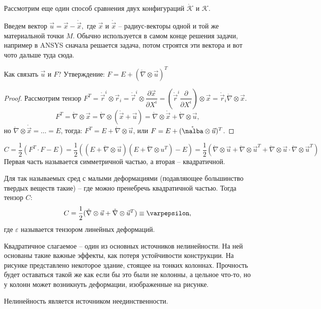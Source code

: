 Рассмотрим еще один способ сравнения двух конфигураций $\mathring{\mathcal{K}}$ и $\mathcal{K}$.


Введем вектор $\vec{u} = \vec{x} - \mathring{\vec{x}},$ где $\vec{x}$ и $\mathring{\vec{x}}$ --
радиус-векторы одной и той же материальной точки $M$. Обычно используется в самом конце решения задачи, например в ANSYS сначала решается задача, потом строятся эти вектора и вот чото дальше туда сюда.

Как связать $\vec{u}$ и $F$?
Утверждение: $F = E + (\mathring{\nabla} \otimes \vec{u})^T$
\begin{proof}
  Рассмотрим тензор $F^T = \mathring{\vec{r}}^i \otimes \vec{r}_i = \mathring{\vec{r}}^i \otimes \dfrac{\partial \vec{x}}{\partial X^i} = \left( \mathring{\vec{r}}^i \dfrac{\partial }{\partial X^i}  \right) \otimes \vec{x} = \mathring{\vec{r}}_i \mathring{\nabla} \otimes \vec{x}$.
  \[
    F^T = \mathring{\nabla} \otimes \vec{x} = \mathring{\nabla} \otimes (\mathring{\vec{x}} + \vec{u}) = \mathring{\nabla} \otimes \mathring{\vec{x}} + \mathring{\nabla} \otimes \vec{u},
  \]
  но $\mathring{\nabla} \otimes \mathring{\vec{x}} = \dots = E$, тогда: %
  $ F^T = E + \mathring{\nabla} \otimes \vec{u} $, или $F = E + (\mathring{\nalba} \otimes \vec{u})^T$.
\end{proof}

\begin{corollary}
  \[
    C = \dfrac{1}{2} (F^T \cdot F - E)
    = \dfrac{1}{2} ( (E + \mathring{\nabla} \otimes \vec{u})(E + \mathring{\nabla} \otimes u^T) - E)
    = \dfrac{1}{2} ( \mathring{\nabla} \otimes \vec{u} + \mathring{\nabla} \otimes \vec{u}^T + \mathring{\nabla} \otimes \vec{u} \cdot \mathring{\nabla} \otimes \vec{u}^T )
  \]
  Первая часть называется симметричной частью, а вторая -- квадратичной.
\end{corollary}

Для так называемых сред с малыми деформациями (подавляющее большинство твердых веществ такие) --
где можно пренебречь квадратичной частью. Тогда тензор $C$:
\[
  C = \dfrac{1}{2} (\mathring{\nabla} \otimes \vec{u} + \mathring{\nabla} \otimes \vec{u}^T) \equiv \varpepsilon,
\]
где $\varepsilon$ называется тензором линейных деформаций.

Квадратичное слагаемое -- один из основных источников нелинейности. На ней основаны такие важные эффекты, как потеря устойчивости конструкции. На рисунке представлено некоторое здание, стоящее на тонких колоннах. Прочность будет оставаться такой же как если бы это были не колонны, а цельное что-то,
но у колонн может возникнуть деформации, изображенные на рисунке.

Нелинейность является источником неединственности.
